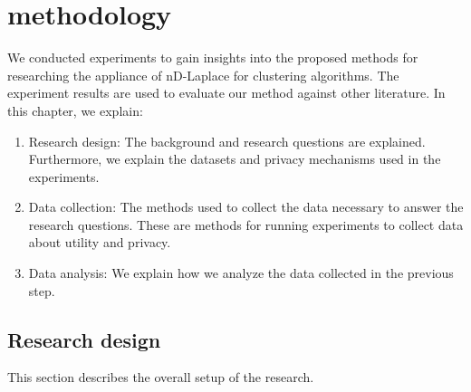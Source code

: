 \chapter{ methodology}  \label{chapter:methodology}
We conducted experiments to gain insights into the proposed methods for researching the appliance of nD-Laplace for clustering algorithms.
The experiment results are used to evaluate our method against other literature.
In this chapter, we explain:
\begin{enumerate}
    \item Research design: The background and research questions are explained.
          Furthermore, we explain the datasets and privacy mechanisms used in the experiments.
    \item Data collection: The methods used to collect the data necessary to answer the research questions.
          These are methods for running experiments to collect data about utility and privacy.
    \item Data analysis: We explain how we analyze the data collected in the previous step.
\end{enumerate}

\section{Research design}
This section describes the overall setup of the research.

